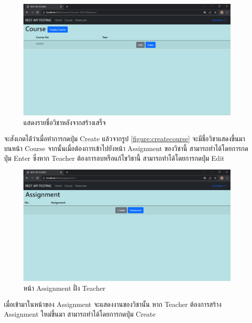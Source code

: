 \begin{figure}[H]
    \captionsetup{justification=centering}
    \centering
    \includegraphics[width=5in]{figures/chapter4/cn101.PNG}
    \caption{แสดงรายชื่อวิชาหลังจากสร้างเสร็จ}
    \label{figure:course2}
\end{figure}
จะสังเกตได้่ว่าเมื่อทำการกดปุ่ม Create แล้วจากรูป \ref{figure:createcourse} จะมีชื่อวิชาแสดงขึ้นมาบนหน้า Course จากนั้นเมื่อต้องการเข้าไปยังหน้า Assignment ของวิชานี้ สามารถทำได้โดยการกดปุ่ม Enter ซึ่งหาก Teacher ต้องการลบหรือแก้ไขวิชานี้ สามารถทำได้โดยการกดปุ่ม Edit 
\newpage

\begin{figure}[H]
    \captionsetup{justification=centering}
    \centering
    \includegraphics[width=5in]{figures/chapter4/assignteacher.PNG}
    \caption{หน้า Assignment ฝั่ง Teacher}
    \label{figure:assign}
\end{figure}
เมื่อเข้ามาในหน้าของ Assignment จะแสดงงานของวิชานั้น หาก Teacher ต้องการสร้าง Assignment ใหม่ขึ้นมา สามารถทำได้โดยการกดปุ่ม Create

